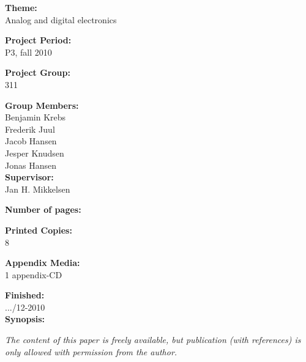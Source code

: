 \begin{multicols}{2}

\small{\textbf{Theme:\\}
Analog and digital electronics

\textbf{Project Period:\\}
P3, fall 2010

\textbf{Project Group:\\}
311

\textbf{Group Members:\\}
Benjamin Krebs\\
Frederik Juul\\
Jacob Hansen\\
Jesper Knudsen\\
Jonas Hansen\\

\textbf{Supervisor:\\}
Jan H. Mikkelsen

\textbf{Number of pages:\\}
\pageref{LastPage}

\textbf{Printed Copies:\\}
8

\textbf{Appendix Media:\\}
1 appendix-CD

\textbf{Finished:\\}
.../12-2010
\\
\textbf{Synopsis:}}

\newline
\end{multicols}
\textit{\scriptsize{The content of this paper is freely available, but publication (with references) is only allowed with permission from the author.}}